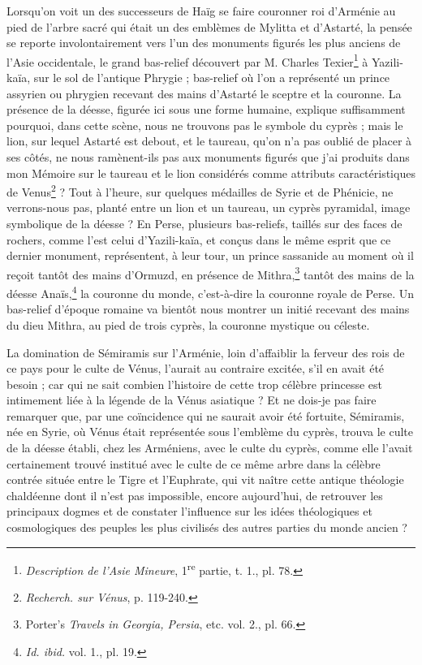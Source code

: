 \documentclass{article}
\begin{document}
Lorsqu'on voit un des successeurs de Haïg se faire couronner roi d'Arménie au pied de l'arbre sacré qui était un des emblèmes de Mylitta et d'Astarté, la pensée se reporte involontairement vers l'un des monuments figurés les plus anciens de l'Asie occidentale, le grand bas-relief découvert par M. Charles Texier\footnote{\emph{Description de l'Asie Mineure}, 1\textsuperscript{re} partie, t. 1., pl. 78.} à Yazili-kaïa, sur le sol de l'antique Phrygie ; bas-relief où l'on a représenté un prince assyrien ou phrygien recevant des mains d'Astarté le sceptre et la couronne. La présence de la déesse, figurée ici sous une forme humaine, explique suffisamment pourquoi, dans cette scène, nous ne trouvons pas le symbole du cyprès ; mais le lion, sur lequel Astarté est debout, et le taureau, qu'on n'a pas oublié de placer à ses côtés, ne nous ramènent-ils pas aux monuments figurés que j'ai produits dans mon Mémoire sur le taureau et le lion considérés comme attributs caractéristiques de Venus\footnote{\emph{Recherch. sur Vénus}, p. 119-240.} ? Tout à l'heure, sur quelques médailles de Syrie et de Phénicie, ne verrons-nous pas, planté entre un lion et un taureau, un cyprès pyramidal, image symbolique de la déesse ? En Perse, plusieurs bas-reliefs, taillés sur des faces de rochers, comme l'est celui d'Yazili-kaïa, et conçus dans le même esprit que ce dernier monument, représentent, à leur tour, un prince sassanide au moment où il reçoit tantôt des mains d'Ormuzd, en présence de Mithra,\footnote{Porter's \emph{Travels in Georgia, Persia}, etc. vol. 2., pl. 66.} tantôt des mains de la déesse Anaïs,\footnote{\emph{Id. ibid.} vol. 1., pl. 19.} la couronne du monde, c'est-à-dire la couronne royale de Perse. Un bas-relief d'époque romaine va bientôt nous montrer un initié recevant des mains du dieu Mithra, au pied de trois cyprès, la couronne mystique ou céleste.

La domination de Sémiramis sur l'Arménie, loin d'affaiblir la ferveur des rois de ce pays pour le culte de Vénus, l'aurait au contraire excitée, s'il en avait été besoin ; car qui ne sait combien l'histoire de cette trop célèbre princesse est intimement liée à la légende de la Vénus asiatique ? Et ne dois-je pas faire remarquer que, par une coïncidence qui ne saurait avoir été fortuite, Sémiramis, née en Syrie, où Vénus était représentée sous l'emblème du cyprès, trouva le culte de la déesse établi, chez les Arméniens, avec le culte du cyprès, comme elle l'avait certainement trouvé institué avec le culte de ce même arbre dans la célèbre contrée située entre le Tigre et l'Euphrate, qui vit naître cette antique théologie chaldéenne dont il n'est pas impossible, encore aujourd'hui, de retrouver les principaux dogmes et de constater l'influence sur les idées théologiques et cosmologiques des peuples les plus civilisés des autres parties du monde ancien ?
\end{document}
